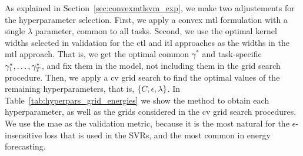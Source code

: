 %
As explained in Section~\ref{sec:convexmtlsvm_exp}, we make two adjustements for the hyperparameter selection.
%
%
First, we apply a convex \acrshort{mtl} formulation with a single $\lambda$ parameter, common to all tasks.
%
Second, we use the optimal kernel widths selected in validation for the \acrshort{ctl} and \acrshort{itl} approaches as the widths in the \acrshort{mtl} approach. That is, we get the optimal common $\gamma^*$ and task-specific $\gamma^*_1, \ldots, \gamma^*_T$, and fix them in the  model, not including them in the grid search procedure.
Then, we apply a \acrshort{cv} grid search to find the optimal values of the remaining hyperparameters, that is, $\left\{C, \epsilon, \lambda\right\}$.
%
In Table~\ref{tab:hyperpars_grid_energies} we show the method to obtain each hyperparameter, as well as the grids considered in the \acrshort{cv} grid search procedures.
We use the \acrshort{mae} as the validation metric, because it is the most natural for the $\epsilon$-insensitive loss that is used in the SVRs, and the most common in energy forecasting.

